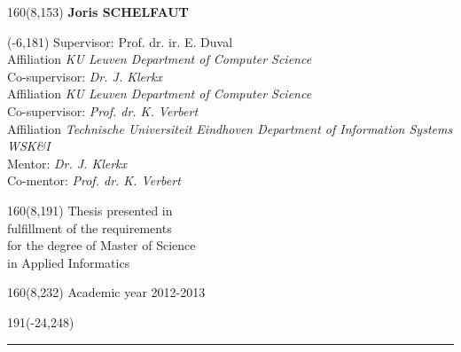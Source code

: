 \documentclass[12pt,a4paper,oneside]{book}
\begin{document}
\begin{textblock}{160}(8,153)
\textblockcolour{}
\vspace{-\parskip}
\flushright
\fontsize{14}{16}\selectfont \textbf{Joris SCHELFAUT}
\end{textblock}
%
\begin{textblock}{90}(-6,181)
\textblockcolour{}
\vspace{-\parskip}
\flushleft
Supervisor: Prof. dr. ir. E. Duval\\[-2pt]
\textcolor{blueaff}{Affiliation \textsl{KU Leuven Department of Computer Science}}\\[5pt]
Co-supervisor: \textsl{Dr. J. Klerkx}\\[-2pt]
\textcolor{blueaff}{Affiliation \textsl{KU Leuven Department of Computer Science}}\\[5pt]
Co-supervisor: \textsl{Prof. dr. K. Verbert}\\[-2pt]
\textcolor{blueaff}{Affiliation \textsl{Technische Universiteit Eindhoven Department of Information Systems WSK\&I}}\\[5pt]
Mentor: \textsl{Dr. J. Klerkx}\\[-2pt]
Co-mentor: \textsl{Prof. dr. K. Verbert}\\[-2pt]
\end{textblock}
%
\begin{textblock}{160}(8,191)
\textblockcolour{}
\vspace{-\parskip}
\flushright
Thesis presented in\\[4.5pt]
fulfillment of the requirements\\[4.5pt]
for the degree of Master of Science\\[4.5pt]
in Applied Informatics\\
\end{textblock}
%
\begin{textblock}{160}(8,232)
\textblockcolour{}
\vspace{-\parskip}
\flushright
Academic year 2012-2013
\end{textblock}
%
\begin{textblock}{191}(-24,248)
{\color{blueline}\rule{550pt}{5.5pt}}
\end{textblock}
%
\vfill
\newpage


\end{document}
